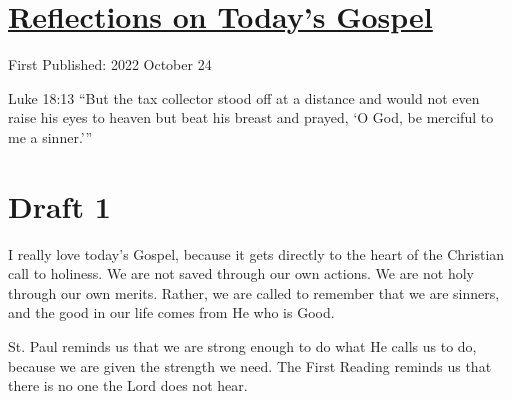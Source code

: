 \documentclass[12pt]{article}[titlepage]
\newcommand{\say}[1]{``#1''}
\newcommand{\nsay}[1]{`#1'}
\newcommand{\1}{\={a}}
\newcommand{\2}{\={e}}
\newcommand{\3}{\={\i}}
\newcommand{\4}{\=o}
\newcommand{\5}{\=u}
\newcommand{\6}{\={A}}
\renewcommand{\,}{\textsuperscript{,}}
\begin{document}
\doublespacing
\section{\href{reflections-on-readings-30-ordinary-c-22.html}{Reflections on Today's Gospel}}
First Published: 2022 October 24

Luke 18:13 \say{But the tax collector stood off at a distance and would not even raise his eyes to heaven but beat his breast and prayed, \nsay{O God, be merciful to me a sinner.}}

\section{Draft 1}
I really love today's Gospel, because it gets directly to the heart of the Christian call to holiness.
We are not saved through our own actions.
We are not holy through our own merits.
Rather, we are called to remember that we are sinners, and the good in our life comes from He who is Good.

St. Paul reminds us that we are strong enough to do what He calls us to do, because we are given the strength we need.
The First Reading reminds us that there is no one the Lord does not hear.
\end{document}
